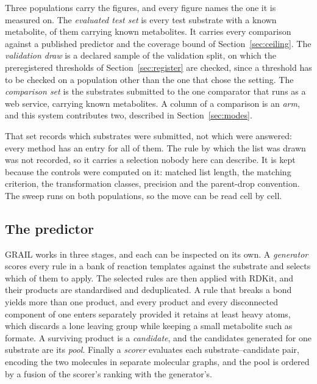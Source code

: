 Three populations carry the figures, and every figure names the one it is measured on. The
\emph{evaluated test set} is every test substrate with a known metabolite, \numWholeN{} of them
carrying \numWholeReferences{} known metabolites. It carries every
comparison against a published predictor and the coverage bound of Section~\ref{sec:ceiling}. The \emph{validation draw} is a declared sample of the validation split, on which the
preregistered thresholds of Section~\ref{sec:register} are checked, since a threshold has to be checked on
a population other than the one that chose the setting. The
\emph{comparison set} is the \numPopulationN{} substrates submitted to the one comparator that
runs as a web service, carrying \numPopulationReferences{} known metabolites. A column of a
comparison is an \emph{arm}, and this system contributes two, described in
Section~\ref{sec:modes}.

That set records which substrates were submitted, not which were answered: every method has an
entry for all of them. The rule by which the list was drawn was not recorded, so it carries a
selection nobody here can describe. It is kept because the controls were computed on it: matched list
length, the matching criterion, the transformation classes, precision and the parent-drop
convention. The sweep runs on both populations, so the move can be read cell by
cell.

\subsection{The predictor}

GRAIL works in three stages, and each can be inspected on its own. A \emph{generator} scores every
rule in a bank of reaction templates against the substrate and selects which of them to apply. The selected rules
are then applied with RDKit, and their products are standardised \citep{Hahnke_2018,
Mansouri_2024} and deduplicated. A rule that breaks a bond yields more than one product, and every
product and every disconnected component of one enters separately provided it
retains at least \numFragmentFloorWord{} heavy atoms, which discards a lone leaving group while
keeping a small metabolite such as formate. A surviving product is a \emph{candidate}, and the
candidates generated for one substrate are its \emph{pool}. Finally a \emph{scorer} evaluates each
substrate--candidate pair, encoding the two molecules in separate molecular graphs, and the pool is
ordered by a fusion of the scorer's ranking with the generator's.

